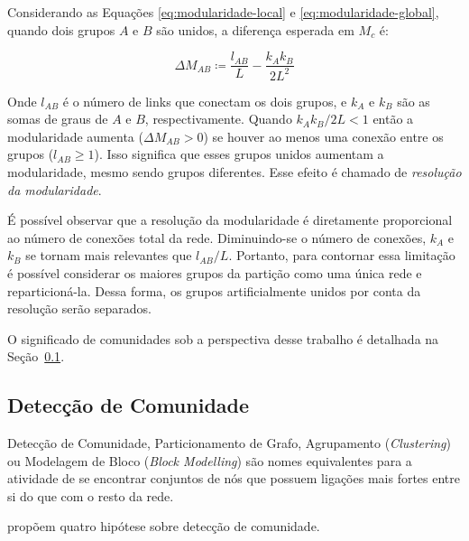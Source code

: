 \documentclass[12pt,a4paper]{article}
\theoremstyle{hypo}
\newcommand{\defn}{\coloneqq} %
\begin{document}
Considerando as Equações \ref{eq:modularidade-local} e \ref{eq:modularidade-global}, quando dois grupos $A$ e $B$ são unidos, a diferença esperada em $M_c$ é:

\begin{equation}
\Delta M_{AB} \defn \frac{l_{AB}}{L} - \frac{k_A k_B}{2L^2}
\end{equation}

Onde $l_{AB}$ é o número de links que conectam os dois grupos, e $k_A$ e $k_B$ são as somas de graus de $A$ e $B$, respectivamente. Quando $k_A k_B / 2L < 1$ então a modularidade aumenta ($\Delta M_{AB} > 0$) se houver ao menos uma conexão entre os grupos ($l_{AB} \geq 1$). Isso significa que esses grupos unidos aumentam a modularidade, mesmo sendo grupos diferentes. Esse efeito é chamado de \textit{resolução da modularidade}.

É possível observar que a resolução da modularidade é diretamente proporcional ao número de conexões total da rede. Diminuindo-se o número de conexões, $k_A$ e $k_B$ se tornam mais relevantes que $l_{AB} / L$. Portanto, para contornar essa limitação é possível considerar os maiores grupos da partição como uma única rede e reparticioná-la. Dessa forma, os grupos artificialmente unidos por conta da resolução serão separados.


O significado de comunidades sob a perspectiva desse trabalho é detalhada na Seção~\ref{sec:deteccao-comunidade}.

\subsection{Detecção de Comunidade} \label{sec:deteccao-comunidade}

Detecção de Comunidade, Particionamento de Grafo, Agrupamento (\textit{Clustering}) ou Modelagem de Bloco (\textit{Block Modelling}) são nomes equivalentes para a atividade de se encontrar conjuntos de nós que possuem ligações mais fortes entre si do que com o resto da rede.

 propõem quatro hipótese sobre detecção de comunidade.
\end{document}
